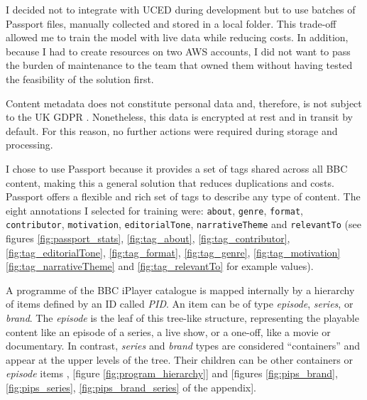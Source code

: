 
I decided not to integrate with UCED during development but to use batches of Passport files,
manually collected and stored in a local folder.
This trade-off allowed me to train the model with live data while reducing costs.
In addition, because I had to create resources on two AWS accounts,
I did not want to pass the burden of maintenance to the team that owned them without having tested the feasibility of the solution first.


Content metadata does not constitute personal data and, therefore, is not subject to the UK GDPR  \cite{UKGDPR}.
Nonetheless, this data is encrypted at rest and in transit by default.
For this reason, no further actions were required during storage and processing.


I chose to use Passport because it provides a set of tags shared across all BBC content,
making this a general solution that reduces duplications and costs.
Passport offers a flexible and rich set of tags to describe any type of content.
The eight annotations I selected for training were:
\verb|about|, \verb|genre|, \verb|format|, \verb|contributor|, \verb|motivation|,
\verb|editorialTone|, \verb|narrativeTheme| and \verb|relevantTo|
(see figures \ref{fig:passport_stats}, \ref{fig:tag_about}, \ref{fig:tag_contributor},
\ref{fig:tag_editorialTone}, \ref{fig:tag_format}, \ref{fig:tag_genre}, \ref{fig:tag_motivation}
\ref{fig:tag_narrativeTheme} and \ref{fig:tag_relevantTo} for example values).


A programme of the BBC iPlayer catalogue is mapped internally by a hierarchy of items defined by an ID called \textit{PID}.
An item can be of type \textit{episode}, \textit{series}, or \textit{brand}. The \textit{episode} is the leaf of this tree-like structure,
representing the playable content like an episode of a series, a live show, or a one-off, like a movie or documentary.
In contrast, \textit{series} and \textit{brand} types are considered ``containers'' and appear at the upper levels of the tree.
Their children can be other containers or \textit{episode} items \cite{BBC:ProgrammePages,BBC:ProgrammeUrlStructure},
[figure \ref{fig:program_hierarchy}] and [figures \ref{fig:pips_brand}, \ref{fig:pips_series}, \ref{fig:pips_brand_series} of the appendix].

